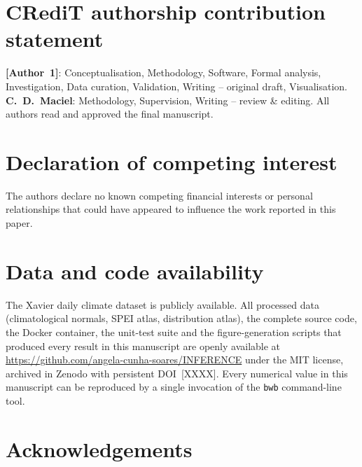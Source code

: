 \documentclass[review,5p,times]{elsarticle}
\begin{document}
\section*{CRediT authorship contribution statement}

\textbf{[Author~1]}: Conceptualisation, Methodology, Software, Formal
analysis, Investigation, Data curation, Validation, Writing -- original
draft, Visualisation. \textbf{C.~D.~Maciel}: Methodology, Supervision,
Writing -- review \& editing. All authors read and approved the final
manuscript.

\section*{Declaration of competing interest}

The authors declare no known competing financial interests or personal
relationships that could have appeared to influence the work reported
in this paper.

\section*{Data and code availability}

The Xavier daily climate dataset \cite{Xavier2022} is publicly
available. All processed data (climatological normals, SPEI atlas,
distribution atlas), the complete source code, the Docker container,
the unit-test suite and the figure-generation scripts that produced
every result in this manuscript are openly available at
\url{https://github.com/angela-cunha-soares/INFERENCE} under the MIT license,
archived in Zenodo with persistent DOI~[XXXX]. Every numerical value
in this manuscript can be reproduced by a single invocation of the
\texttt{bwb} command-line tool.

\section*{Acknowledgements}
\end{document}
